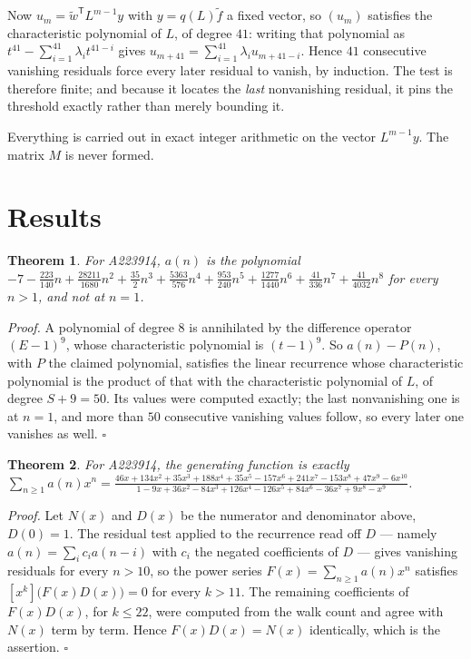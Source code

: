 \documentclass[11pt]{article}
\newtheorem{theorem}{Theorem}
\theoremstyle{definition}
\begin{document}
Now $u_m = \tilde w^{\mathsf T} L^{m-1} y$ with $y = q(L)\tilde f$ a fixed vector, so $(u_m)$ satisfies the characteristic polynomial of $L$, of degree $41$: writing that polynomial as $t^{41} - \sum_{i=1}^{41} \lambda_i t^{41-i}$ gives $u_{m+41} = \sum_{i=1}^{41} \lambda_i u_{m+41-i}$. Hence $41$ consecutive vanishing residuals force every later residual to vanish, by induction. The test is therefore finite; and because it locates the {\itshape last} nonvanishing residual, it pins the threshold exactly rather than merely bounding it.

Everything is carried out in exact integer arithmetic on the vector $L^{m-1}y$. The matrix $M$ is never formed.

\section{Results}

\begin{theorem} For A223914, $a(n)$ is the polynomial $-7 - \frac{223}{140}n + \frac{28211}{1680}n^{2} + \frac{35}{2}n^{3} + \frac{5363}{576}n^{4} + \frac{953}{240}n^{5} + \frac{1277}{1440}n^{6} + \frac{41}{336}n^{7} + \frac{41}{4032}n^{8}$ for every $n > 1$, and not at $n = 1$.\end{theorem}

{\itshape Proof.} A polynomial of degree $8$ is annihilated by the difference operator $(E-1)^{9}$, whose characteristic polynomial is $(t-1)^{9}$. So $a(n) - P(n)$, with $P$ the claimed polynomial, satisfies the linear recurrence whose characteristic polynomial is the product of that with the characteristic polynomial of $L$, of degree $S + 9 = 50$. Its values were computed exactly; the last nonvanishing one is at $n = 1$, and more than $50$ consecutive vanishing values follow, so every later one vanishes as well. $\square$

\begin{theorem} For A223914, the generating function is exactly $\sum_{n\ge 1} a(n)x^n = \frac{46x + 134x^{2} + 35x^{3} + 188x^{4} + 35x^{5} - 157x^{6} + 241x^{7} - 153x^{8} + 47x^{9} - 6x^{10}}{1 - 9x + 36x^{2} - 84x^{3} + 126x^{4} - 126x^{5} + 84x^{6} - 36x^{7} + 9x^{8} - x^{9}}$.\end{theorem}

{\itshape Proof.} Let $N(x)$ and $D(x)$ be the numerator and denominator above, $D(0)=1$. The residual test applied to the recurrence read off $D$ --- namely $a(n) = \sum_i c_i a(n-i)$ with $c_i$ the negated coefficients of $D$ --- gives vanishing residuals for every $n > 10$, so the power series $F(x)=\sum_{n\ge 1}a(n)x^n$ satisfies $[x^k]\bigl(F(x)D(x)\bigr) = 0$ for every $k > 11$. The remaining coefficients of $F(x)D(x)$, for $k \le 22$, were computed from the walk count and agree with $N(x)$ term by term. Hence $F(x)D(x) = N(x)$ identically, which is the assertion. $\square$
\end{document}
